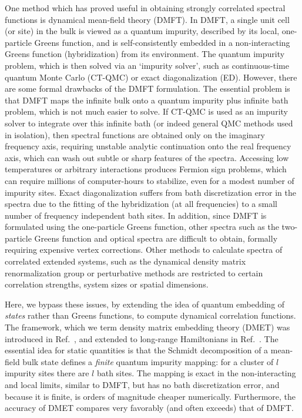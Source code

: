 \documentclass[aps,twocolumn,nobibnotes]{revtex4}
\begin{document}
One method which has proved useful in obtaining strongly correlated spectral functions is dynamical mean-field 
theory (DMFT)\cite{Georges1992,Georges1996,Kotliar2006}. In 
DMFT, a single unit cell (or site) in the bulk is viewed as a quantum impurity, described by its local, one-particle Greens function,
and is self-consistently embedded in a non-interacting Greens function (hybridization) from its environment.
The quantum impurity problem, which is then solved via an `impurity solver', such as
continuous-time quantum Monte Carlo (CT-QMC)\cite{Millis2006} or exact diagonalization (ED)\cite{Zgid2012}. 
However, there are some formal drawbacks of the DMFT formulation. 
The essential problem is that DMFT maps the infinite bulk onto a quantum impurity plus infinite bath problem, which is not much easier to solve.
If CT-QMC is used as an 
impurity solver to integrate over this infinite bath (or indeed general QMC methods used in isolation), then spectral 
functions are obtained only on the imaginary frequency 
axis, requiring unstable analytic continuation onto the real frequency axis, which can wash out subtle or sharp features of the 
spectra\cite{Thomas2011}. Accessing low temperatures or arbitrary interactions produces Fermion sign problems, which can require millions
of computer-hours to stabilize, even for a modest number of impurity sites.
Exact diagonalization suffers from bath discretization error in the spectra due to the 
fitting of the hybridization (at all frequencies) to a small number of frequency independent bath sites. In addition, since DMFT
is formulated using the one-particle Greens function, other spectra such as the two-particle Greens function and optical spectra are 
difficult to obtain, formally requiring expensive vertex corrections\cite{Millis2012}. Other methods to calculate 
spectra of correlated extended systems, such as the dynamical density matrix renormalization group\cite{Jeckelmann2004} or perturbative
methods\cite{Senechal2000} are restricted to certain correlation strengths, system sizes or spatial dimensions.

Here, we bypass these issues, by extending the idea of quantum embedding of {\em states} rather than Greens functions, to compute dynamical
correlation functions. The framework, which we term density matrix embedding theory (DMET) was introduced in 
Ref.~, and extended to long-range Hamiltonians in Ref.~. 
The essential idea for static quantities is that the Schmidt decomposition of a mean-field bulk state defines a {\em finite} quantum impurity mapping:
for a cluster of $l$ impurity sites there are $l$ bath sites. The mapping is exact in the non-interacting and local limits, similar to DMFT, but
has no bath discretization error, and because it is finite, is orders of magnitude cheaper numerically. Furthermore, the accuracy of DMET compares
very favorably (and often exceeds) that of DMFT.
\end{document}
